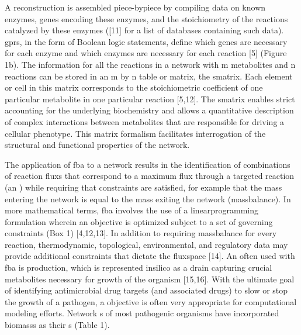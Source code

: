 A \gls{reconstruction} is assembled piece-bypiece 
by compiling data on known enzymes, genes encoding these enzymes, 
and the stoichiometry of the reactions catalyzed by these enzymes 
([11] for a list of databases containing such data). \glspl{gpr}, 
in the form of Boolean logic statements, define 
which genes are necessary for each enzyme and which enzymes are 
necessary for each reaction [5] (Figure 1b). The information for 
all the reactions in a network  with m metabolites 
and n reactions can be stored in an m by n table or matrix, the 
\gls{smatrix}. Each element or cell in this matrix 
corresponds to the stoichiometric coefficient of one particular 
metabolite in one particular reaction [5,12]. The \gls{smatrix} enables 
strict accounting for the underlying biochemistry and allows a 
quantitative description of complex interactions between metabolites 
that are responsible for driving a cellular phenotype. This matrix 
formalism facilitates interrogation of the structural and functional 
properties of the network.

The application of \gls{fba} to a network  results in the 
identification of combinations of reaction \glspl{flux} that correspond 
to a maximum \gls{flux} through a targeted reaction (an ) while 
requiring that constraints are satisfied, for example that the 
mass entering the network is equal to the mass exiting the network (\gls{massbalance}). 
In more mathematical terms, \gls{fba} involves the use of a 
\gls{linearprogramming} formulation wherein an objective is optimized subject 
to a set of governing constraints (Box 1) [4,12,13]. In addition 
to requiring \gls{massbalance} for every reaction, thermodynamic, 
topological, environmental, and regulatory data may provide 
additional constraints that dictate the \gls{fluxspace} [14]. 
An  often used with \gls{fba} is  production, which is 
represented \gls{insilico} as a drain capturing crucial metabolites 
necessary for growth of the organism [15,16]. With the ultimate 
goal of identifying antimicrobial drug targets (and associated 
drugs) to slow or stop the growth of a pathogen, a  objective
is often very appropriate for computational modeling efforts. 
Network s of most pathogenic organisms have incorporated 
\glspl{biomass} as their s (Table 1).


